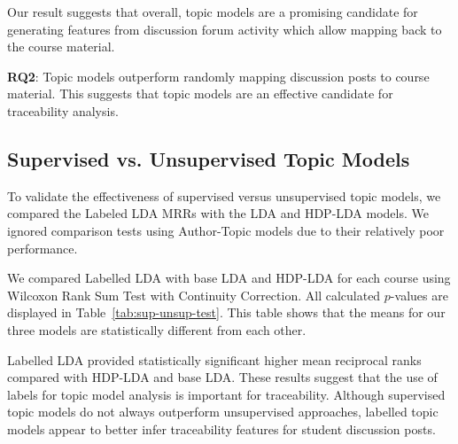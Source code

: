 \documentclass[sigconf, anonymous]{acmart}
\begin{document}
Our result suggests that overall, topic models are a promising candidate for generating features from discussion forum activity which allow mapping back to the course material. %


\begin{tcolorbox}[sharp corners, top=1mm, bottom=1mm]
\textbf{RQ2}: Topic models outperform randomly mapping discussion posts to course material. This suggests that topic models are an effective candidate for traceability analysis.
\end{tcolorbox}

\subsection{Supervised vs. Unsupervised Topic Models}

To validate the effectiveness of supervised versus unsupervised topic models, we compared the Labeled LDA MRRs with the LDA and HDP-LDA models.
We ignored comparison tests using Author-Topic models due to their relatively poor performance.

We compared Labelled LDA with base LDA and HDP-LDA for each course using Wilcoxon Rank Sum Test with Continuity Correction.
All calculated $p$-values are displayed in Table~\ref{tab:sup-unsup-test}.
This table shows that the means for our three models are statistically different from each other.

Labelled LDA provided statistically significant higher mean reciprocal ranks compared with HDP-LDA and base LDA.
These results suggest that the use of labels for topic model analysis is important for traceability.
Although supervised topic models do not always outperform unsupervised approaches, labelled topic models appear to better infer traceability features for student discussion posts.
\end{document}
